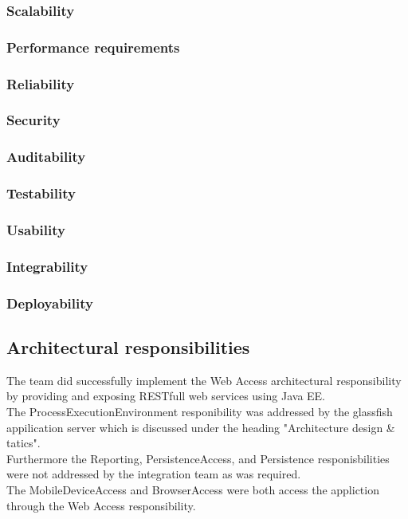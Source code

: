 \documentclass[a4paper,10pt]{article}
\begin{document}
\subsubsection{Scalability}

\subsubsection{Performance requirements}

\subsubsection{Reliability}

\subsubsection{Security}

\subsubsection{Auditability}

\subsubsection{Testability}

\subsubsection{Usability}

\subsubsection{Integrability}

\subsubsection{Deployability}

\subsection{Architectural responsibilities}
The team did successfully implement the Web Access architectural responsibility by providing and exposing RESTfull web services using Java EE. \\
The ProcessExecutionEnvironment responibility was addressed by the glassfish appilication server which is discussed under the heading "Architecture design \& tatics". \\
Furthermore the Reporting, PersistenceAccess, and Persistence responisbilities were not addressed by the integration team as was required. \\
The MobileDeviceAccess and BrowserAccess were both access the appliction through the Web Access responsibility.
\end{document}
